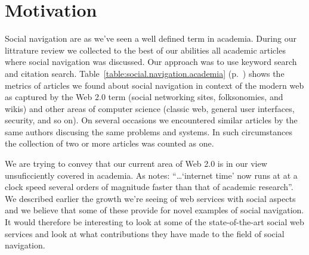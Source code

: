 \section{Motivation}

Social navigation are as we've seen a well defined term in academia. During
our littrature review we collected to the best of our abilities all academic
articles where social navigation was discussed. Our approach was to use
keyword search and citation search.%
\sidefill%
Table~\ref{table:social.navigation.academia}
(p.~\pageref{table:social.navigation.academia}) shows the metrics of articles
we found about social navigation in context of the modern web as captured by
the Web 2.0 term (social networking sites, folksonomies, and wikis) and other
areas of computer science (classic web, general user interfaces, security, and
so on).
On several occasions we encountered similar articles by the same authors
discusing the same problems and systems. In such circumstances the collection
of two or more articles was counted as one.

We are trying to convey that our current area of Web 2.0 is in our view
unsuficciently covered in academia.
As \citet{beer07} notes: ``\ldots `internet time' now runs at at a clock speed
several orders of magnitude faster than that of academic research''.
We described earlier the growth we're seeing of web services with social
aspects and we believe that some of these provide for novel examples of social
navigation. It would therefore be interesting to look at some of the
state-of-the-art social web services and look at what contributions they have
made to the field of social navigation.



